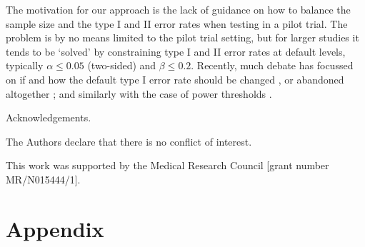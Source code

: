 \documentclass[sagev, Crown]{sagej} %
\begin{document}

The motivation for our approach is the lack of guidance on how to balance the sample size and the type I and II error rates when testing in a pilot trial. The problem is by no means limited to the pilot trial setting, but for larger studies it tends to be `solved' by constraining type I and II error rates at default levels, typically $\alpha \leq 0.05$ (two-sided) and $\beta \leq 0.2$. Recently, much debate has focussed on if and how the default type I error rate should be changed \cite{Benjamin2017}, or abandoned altogether \cite{Amrhein2017, Lakens2018, Amrhein2019}; and similarly with the case of power thresholds \cite{Bacchetti2019}.



\begin{acks}
Acknowledgements.
\end{acks}

\begin{dci}
The Authors declare that there is no conflict of interest.
\end{dci}

\begin{funding}
This work was supported by the Medical Research Council [grant number MR/N015444/1].
\end{funding}




\section*{Appendix}
\end{document}
